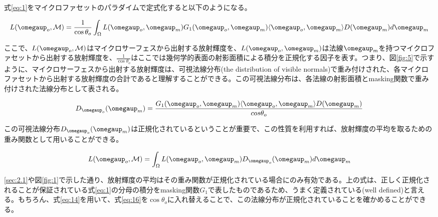 \documentclass[a4j,xelatex,ja=standard]{bxjsarticle}
\begin{document}
式\eqref{eq:1}をマイクロファセットのパラダイムで定式化すると以下のようになる。

\begin{equation}
    L(\boldsymbol{\omegaup}_o, \mathcal{M}) = \frac{1}{\cos\theta_o} \int_\Omega L(\boldsymbol{\omegaup}_o, \boldsymbol{\omegaup}_m) G_1(\boldsymbol{\omegaup}_o, \boldsymbol{\omegaup}_m) \langle \boldsymbol{\omegaup}_o, \boldsymbol{\omegaup}_m \rangle D(\boldsymbol{\omegaup}_m) d\boldsymbol{\omegaup}_m
    \label{eq:15}
\end{equation}

ここで、$L(\boldsymbol{\omegaup}_o, \mathcal{M})$はマイクロサーフェスから出射する放射輝度を、$L(\boldsymbol{\omegaup}_o, \boldsymbol{\omegaup}_m)$は法線$\boldsymbol{\omegaup}_m$を持つマイクロファセットから出射する放射輝度を、$\frac{1}{\cos\theta_o}$はここでは幾何学的表面の射影面積による積分を正規化する因子を表す。つまり、図\ref{fig:5}で示すように、マイクロサーフェスから出射する放射輝度は、可視法線分布(the distribution of visible normals)で重み付けされた、各マイクロファセットから出射する放射輝度の合計であると理解することができる。この可視法線分布は、各法線の射影面積とmasking関数で重み付けされた法線分布として表される。

\begin{equation}
    D_{\boldsymbol{\omegaup}_o}(\boldsymbol{\omegaup}_m) = \frac{G_1(\boldsymbol{\omegaup}_o, \boldsymbol{\omegaup}_m) \langle \boldsymbol{\omegaup}_o, \boldsymbol{\omegaup}_m \rangle D(\boldsymbol{\omegaup}_m)}{cos\theta_o}
    \label{eq:16}
\end{equation}

この可視法線分布$D_{\boldsymbol{\omegaup}_o}(\boldsymbol{\omegaup}_m)$は正規化されているということが重要で、この性質を利用すれば、放射輝度の平均を取るための重み関数として用いることができる。

\begin{equation}
    L(\boldsymbol{\omegaup}_o, \mathcal{M}) = \int_\Omega L(\boldsymbol{\omegaup}_o, \boldsymbol{\omegaup}_m) D_{\boldsymbol{\omegaup}_o}(\boldsymbol{\omegaup}_m) d\boldsymbol{\omegaup}_m
    \label{eq:17}
\end{equation}

\ref{sec:2.1}や図\ref{fig:1}で示した通り、放射輝度の平均はその重み関数が正規化されている場合にのみ有効である。上の式は、正しく正規化されることが保証されている式\eqref{eq:1}の分母の積分をmasking関数$G_1$で表したものであるため、うまく定義されている(well defined)と言える。もちろん、式\eqref{eq:14}を用いて、式\eqref{eq:16}を$\cos\theta_o$に入れ替えることで、この法線分布が正規化されていることを確かめることができる。
\end{document}
